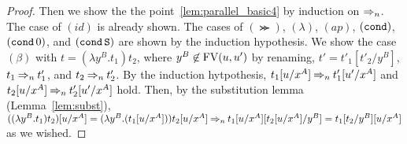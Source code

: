 \begin{proof}
  Then we show the the point~\ref{lem:parallel_basic4} by induction on $\mathbin{\Rightarrow_{n}}$.
  The case of $(id)$ is already shown. 
  The cases of $(\Succ)$, $(\lambda)$, $(ap)$, $({\tt cond})$, $({\tt cond}\,0)$, and $({\tt cond}\,{\tt S})$
  are shown by the induction hypothesis.
  We show the case $(\beta)$ with $t=(\lambda y^B.t_1)t_2$, where $y^B\not\in{{\rm FV}}(u,u')$ by renaming,
  $t'=t'_1[t'_2/y^B]$, $t_1\mathbin{\Rightarrow_{n}} t'_1$, and $t_2\mathbin{\Rightarrow_{n}} t'_2$. 
  By the induction hytpothesis, $t_1[u/x^A] \mathbin{\Rightarrow_{n}} t'_1[u'/x^A]$ and $t_2[u/x^A]\mathbin{\Rightarrow_{n}} t'_2[u'/x^A]$ hold.
  Then, by the substitution lemma (Lemma~\ref{lem:subst}),
  $((\lambda y^B.t_1)t_2)[u/x^A] = (\lambda y^B.(t_1[u/x^A]))t_2[u/x^A] \mathbin{\Rightarrow_{n}} t_1[u/x^A][t_2[u/x^A]/y^B] = t_1[t_2/y^B][u/x^A]$ as we wished. 
\end{proof}

